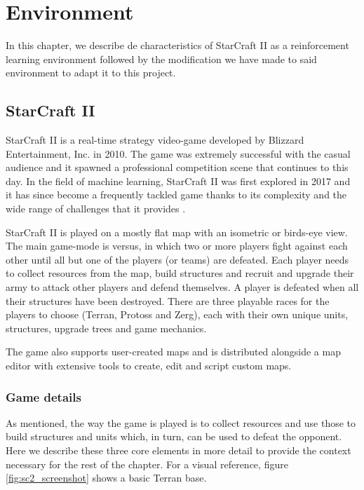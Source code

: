 \chapter{Environment}
\label{chapter:environment}

In this chapter, we describe de characteristics of StarCraft II as a reinforcement learning environment followed by the modification we have made to said environment to adapt it to this project.

\section{StarCraft II}

StarCraft II is a real-time strategy video-game developed by Blizzard Entertainment, Inc. in 2010. The game was extremely successful with the casual audience and it spawned a professional competition scene that continues to this day. In the field of machine learning, StarCraft II was first explored in 2017 \cite{Vinyals:2017} and it has since become a frequently tackled game thanks to its complexity and the wide range of challenges that it provides \cite{Tang:2018}.

StarCraft II is played on a mostly flat map with an isometric or birds-eye view. The main game-mode is versus, in which two or more players fight against each other until all but one of the players (or teams) are defeated. Each player needs to collect resources from the map, build structures and recruit and upgrade their army to attack other players and defend themselves. A player is defeated when all their structures have been destroyed. There are three playable races for the players to choose (Terran, Protoss and Zerg), each with their own unique units, structures, upgrade trees and game mechanics.

The game also supports user-created maps and is distributed alongside a map editor with extensive tools to create, edit and script custom maps.

\subsection{Game details}

As mentioned, the way the game is played is to collect resources and use those to build structures and units which, in turn, can be used to defeat the opponent. Here we describe these three core elements in more detail to provide the context necessary for the rest of the chapter. For a visual reference, figure \ref{fig:sc2_screenshot} shows a basic Terran base.

